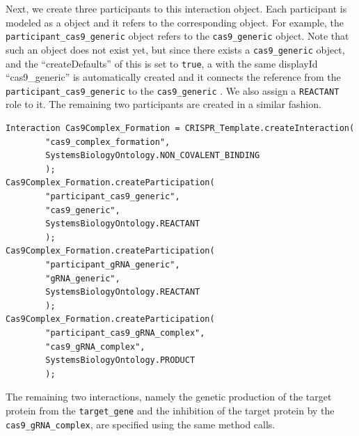 Next, we create three participants to this interaction object. Each participant is modeled as a  object and it refers to the corresponding  object. For example, the \lstinline+participant_cas9_generic+  object refers to the \lstinline+cas9_generic+  object. Note that such an object does not exist yet, but since there exists a \lstinline+cas9_generic+  object, and the ``createDefaults'' of this  is set to \lstinline+true+, a  with the same displayId ``cas9\_generic'' is automatically created and it connects the reference from the \lstinline+participant_cas9_generic+  to the \lstinline+cas9_generic+ . We also assign a \lstinline+REACTANT+ role to it. The remaining two participants are created in a similar fashion.

\vspace{\abovedisplayskip}
\begin{minipage}{0.95\textwidth}%
\begin{lstlisting}
Interaction Cas9Complex_Formation = CRISPR_Template.createInteraction(
        "cas9_complex_formation", 
        SystemsBiologyOntology.NON_COVALENT_BINDING
        );
Cas9Complex_Formation.createParticipation(
        "participant_cas9_generic", 
        "cas9_generic",
        SystemsBiologyOntology.REACTANT
        );
Cas9Complex_Formation.createParticipation(
        "participant_gRNA_generic", 
        "gRNA_generic",
        SystemsBiologyOntology.REACTANT
        );
Cas9Complex_Formation.createParticipation(
        "participant_cas9_gRNA_complex", 
        "cas9_gRNA_complex",
        SystemsBiologyOntology.PRODUCT
        );
\end{lstlisting}
\end{minipage}

The remaining two interactions, namely the genetic production of the target protein from the \lstinline+target_gene+ and the inhibition of the target protein by the \lstinline+cas9_gRNA_complex+, are specified using the same method calls.

